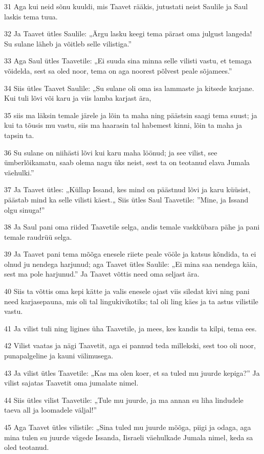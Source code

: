 \par 31 Aga kui neid sõnu kuuldi, mis Taavet rääkis, jutustati neist Saulile ja Saul laskis tema tuua.
\par 32 Ja Taavet ütles Saulile: „Ärgu lasku keegi tema pärast oma julgust langeda! Su sulane läheb ja võitleb selle vilistiga.”
\par 33 Aga Saul ütles Taavetile: „Ei suuda sina minna selle vilisti vastu, et temaga võidelda, sest sa oled noor, tema on aga noorest põlvest peale sõjamees.”
\par 34 Siis ütles Taavet Saulile: „Su sulane oli oma isa lammaste ja kitsede karjane. Kui tuli lõvi või karu ja viis lamba karjast ära,
\par 35 siis ma läksin temale järele ja lõin ta maha ning päästsin saagi tema suust; ja kui ta tõusis mu vastu, siis ma haarasin tal habemest kinni, lõin ta maha ja tapsin ta.
\par 36 Su sulane on niihästi lõvi kui karu maha löönud; ja see vilist, see ümberlõikamatu, saab olema nagu üks neist, sest ta on teotanud elava Jumala väehulki.”
\par 37 Ja Taavet ütles: „Küllap Issand, kes mind on päästnud lõvi ja karu küüsist, päästab mind ka selle vilisti käest.„ Siis ütles Saul Taavetile: ”Mine, ja Issand olgu sinuga!”
\par 38 Ja Saul pani oma riided Taavetile selga, andis temale vaskkübara pähe ja pani temale raudrüü selga.
\par 39 Ja Taavet pani tema mõõga enesele riiete peale vööle ja katsus kõndida, ta ei olnud ju nendega harjunud; aga Taavet ütles Saulile: „Ei mina saa nendega käia, sest ma pole harjunud.” Ja Taavet võttis need oma seljast ära.
\par 40 Siis ta võttis oma kepi kätte ja valis enesele ojast viis siledat kivi ning pani need karjasepauna, mis oli tal lingukivikotiks; tal oli ling käes ja ta astus vilistile vastu.
\par 41 Ja vilist tuli ning ligines üha Taavetile, ja mees, kes kandis ta kilpi, tema ees.
\par 42 Vilist vaatas ja nägi Taavetit, aga ei pannud teda millekski, sest too oli noor, punapalgeline ja kauni välimusega.
\par 43 Ja vilist ütles Taavetile: „Kas ma olen koer, et sa tuled mu juurde kepiga?” Ja vilist sajatas Taavetit oma jumalate nimel.
\par 44 Siis ütles vilist Taavetile: „Tule mu juurde, ja ma annan su liha lindudele taeva all ja loomadele väljal!”
\par 45 Aga Taavet ütles vilistile: „Sina tuled mu juurde mõõga, piigi ja odaga, aga mina tulen su juurde vägede Issanda, Iisraeli väehulkade Jumala nimel, keda sa oled teotanud.
